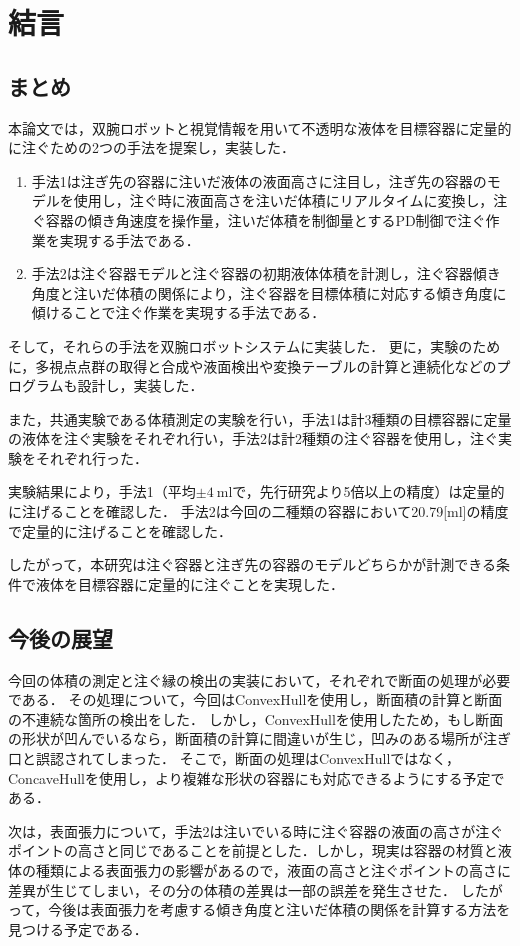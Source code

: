 \chapter{結言}
	\section{まとめ}
	
	本論文では，双腕ロボットと視覚情報を用いて不透明な液体を目標容器に定量的に注ぐための2つの手法を提案し，実装した．
	\begin{enumerate}
	\item 手法1は注ぎ先の容器に注いだ液体の液面高さに注目し，注ぎ先の容器のモデルを使用し，注ぐ時に液面高さを注いだ体積にリアルタイムに変換し，注ぐ容器の傾き角速度を操作量，注いだ体積を制御量とするPD制御で注ぐ作業を実現する手法である．
	\item 手法2は注ぐ容器モデルと注ぐ容器の初期液体体積を計測し，注ぐ容器傾き角度と注いだ体積の関係により，注ぐ容器を目標体積に対応する傾き角度に傾けることで注ぐ作業を実現する手法である．
	\end{enumerate}
	
	そして，それらの手法を双腕ロボットシステムに実装した．
	更に，実験のために，多視点点群の取得と合成や液面検出や変換テーブルの計算と連続化などのプログラムも設計し，実装した．
	
	また，共通実験である体積測定の実験を行い，手法1は計3種類の目標容器に定量の液体を注ぐ実験をそれぞれ行い，手法2は計2種類の注ぐ容器を使用し，注ぐ実験をそれぞれ行った．
	
	実験結果により，手法1（平均$\pm4\ \mathrm{ml}$で，先行研究\cite{Related1}より5倍以上の精度）は定量的に注げることを確認した．
	手法2は今回の二種類の容器において20.79[ml]の精度で定量的に注げることを確認した．
	
	したがって，本研究は注ぐ容器と注ぎ先の容器のモデルどちらかが計測できる条件で液体を目標容器に定量的に注ぐことを実現した．
	
	\section{今後の展望}
	今回の体積の測定と注ぐ縁の検出の実装において，それぞれで断面の処理が必要である．
	その処理について，今回はConvexHullを使用し，断面積の計算と断面の不連続な箇所の検出をした．
	しかし，ConvexHullを使用したため，もし断面の形状が凹んでいるなら，断面積の計算に間違いが生じ，凹みのある場所が注ぎ口と誤認されてしまった．
	そこで，断面の処理はConvexHullではなく，ConcaveHullを使用し，より複雑な形状の容器にも対応できるようにする予定である．
	
	次は，表面張力について，手法2は注いでいる時に注ぐ容器の液面の高さが注ぐポイントの高さと同じであることを前提とした．しかし，現実は容器の材質と液体の種類による表面張力の影響があるので，液面の高さと注ぐポイントの高さに差異が生じてしまい，その分の体積の差異は一部の誤差を発生させた．
	したがって，今後は表面張力を考慮する傾き角度と注いだ体積の関係を計算する方法を見つける予定である．